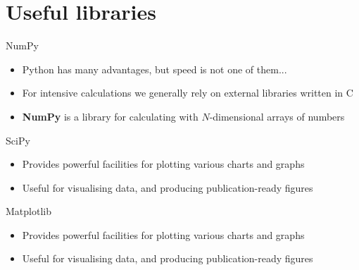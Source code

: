 \part{Useful libraries}
\frame{\partpage}

\begin{frame}{NumPy}
    \begin{itemize}
        \pause\item Python has many advantages, but speed is not one of them...
        \pause\item For intensive calculations we generally rely on external libraries written in C
        \pause\item \textbf{NumPy} is a library for calculating with $N$-dimensional arrays of numbers
    \end{itemize}
\end{frame}

\begin{frame}{SciPy}
    \begin{itemize}
        \pause\item Provides powerful facilities for plotting various charts and graphs
        \pause\item Useful for visualising data, and producing publication-ready figures
    \end{itemize}
\end{frame}

\begin{frame}{Matplotlib}
    \begin{itemize}
        \pause\item Provides powerful facilities for plotting various charts and graphs
        \pause\item Useful for visualising data, and producing publication-ready figures
    \end{itemize}
\end{frame}

